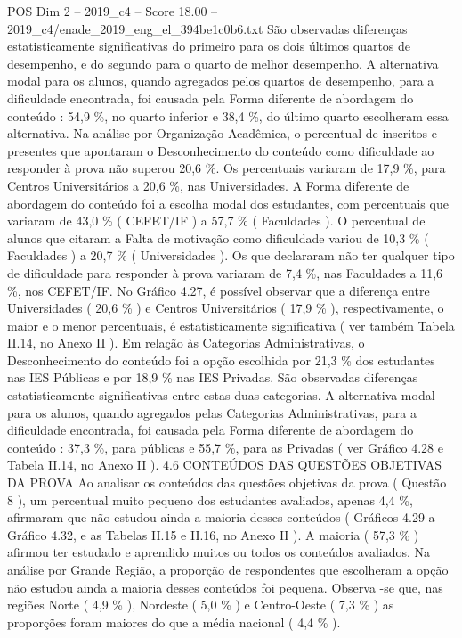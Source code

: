 \begin{textsample}{POS Dim 2 – 2019\_c4 – Score 18.00 – 2019\_c4/enade\_2019\_eng\_el\_394be1c0b6.txt}
São observadas diferenças estatisticamente significativas do primeiro para os dois últimos quartos de desempenho, e do segundo para o quarto de melhor desempenho.
A alternativa modal para os alunos, quando agregados pelos quartos de desempenho, para a dificuldade encontrada, foi causada pela Forma diferente de abordagem do conteúdo : 54,9 \%, no quarto inferior e 38,4 \%, do último quarto escolheram essa alternativa.
Na análise por Organização Acadêmica, o percentual de inscritos e presentes que apontaram o Desconhecimento do conteúdo como dificuldade ao responder à prova não superou 20,6 \%.
Os percentuais variaram de 17,9 \%, para Centros Universitários a 20,6 \%, nas Universidades.
A Forma diferente de abordagem do conteúdo foi a escolha modal dos estudantes, com percentuais que variaram de 43,0 \% ( CEFET/IF ) a 57,7 \% ( Faculdades ).
O percentual de alunos que citaram a Falta de motivação como dificuldade variou de 10,3 \% ( Faculdades ) a 20,7 \% ( Universidades ).
Os que declararam não ter qualquer tipo de dificuldade para responder à prova variaram de 7,4 \%, nas Faculdades a 11,6 \%, nos CEFET/IF.
No Gráfico 4.27, é possível observar que a diferença entre Universidades ( 20,6 \% ) e Centros Universitários ( 17,9 \% ), respectivamente, o maior e o menor percentuais, é estatisticamente significativa ( ver também Tabela II.14, no Anexo II ).
Em relação às Categorias Administrativas, o Desconhecimento do conteúdo foi a opção escolhida por 21,3 \% dos estudantes nas IES Públicas e por 18,9 \% nas IES Privadas.
São observadas diferenças estatisticamente significativas entre estas duas categorias.
A alternativa modal para os alunos, quando agregados pelas Categorias Administrativas, para a dificuldade encontrada, foi causada pela Forma diferente de abordagem do conteúdo : 37,3 \%, para públicas e 55,7 \%, para as Privadas ( ver Gráfico 4.28 e Tabela II.14, no Anexo II ). 4.6 CONTEÚDOS DAS QUESTÕES OBJETIVAS DA PROVA Ao analisar os conteúdos das questões objetivas da prova ( Questão 8 ), um percentual muito pequeno dos estudantes avaliados, apenas 4,4 \%, afirmaram que não estudou ainda a maioria desses conteúdos ( Gráficos 4.29 a Gráfico 4.32, e as Tabelas II.15 e II.16, no Anexo II ).
A maioria ( 57,3 \% ) afirmou ter estudado e aprendido muitos ou todos os conteúdos avaliados.
Na análise por Grande Região, a proporção de respondentes que escolheram a opção não estudou ainda a maioria desses conteúdos foi pequena.
Observa -se que, nas regiões Norte ( 4,9 \% ), Nordeste ( 5,0 \% ) e Centro-Oeste ( 7,3 \% ) as proporções foram maiores do que a média nacional ( 4,4 \% ).

\end{textsample}
